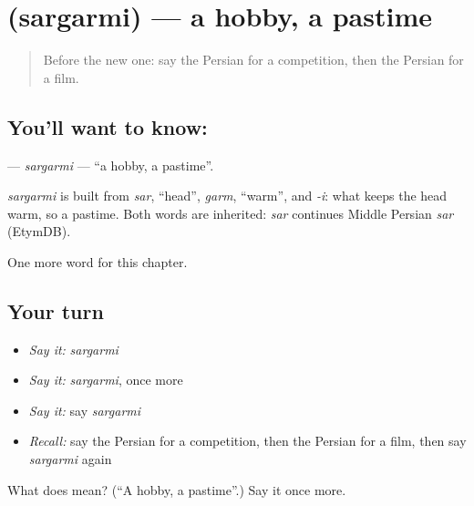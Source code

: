 \section[\texorpdfstring{\fa{سرگرمی} (sargarmi)}{سرگرمی (sargarmi)}]{ (sargarmi) — a hobby, a pastime}

\label{lesson:FA-C243-sargarmi}



\begin{quote}
Before the new one: say the Persian for a competition, then the Persian for a film.
\end{quote}

\subsection*{You'll want to know: }
\textbf{} — \emph{sargarmi} — \textquotedblleft{}a hobby, a pastime\textquotedblright{}.

\begin{cousinweb}
\emph{sargarmi} is built from \emph{sar}, \textquotedblleft{}head\textquotedblright{}, \emph{garm}, \textquotedblleft{}warm\textquotedblright{}, and \emph{-i}: what keeps the head warm, so a pastime. Both words are inherited: \emph{sar} continues Middle Persian \emph{sar} (EtymDB).
\end{cousinweb}

\begin{grammarlens}[title={What you've built}]
One more word for this chapter.
\end{grammarlens}

\subsection*{Your turn}
\begin{itemize}
\raggedright
  \item \emph{Say it:} \emph{sargarmi}
  \item \emph{Say it:} \emph{sargarmi}, once more
  \item \emph{Say it:} say \emph{sargarmi}
  \item \emph{Recall:} say the Persian for a competition, then the Persian for a film, then say \emph{sargarmi} again
\end{itemize}

\begin{tcolorbox}[breakable,colback=teal!4,colframe=teal!35!black,title={Before you move on}]
What does  mean? (\textquotedblleft{}A hobby, a pastime\textquotedblright{}.) Say it once more.
\end{tcolorbox}
